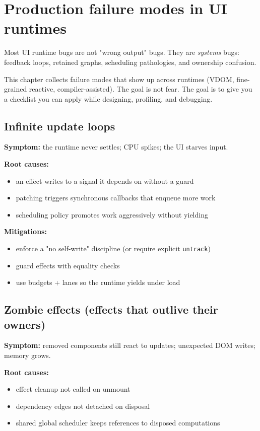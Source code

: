 \chapter{Production failure modes in UI runtimes}
\label{ch:failure-modes}

Most UI runtime bugs are not "wrong output" bugs.
They are \emph{systems} bugs: feedback loops, retained graphs, scheduling pathologies, and ownership confusion.

This chapter collects failure modes that show up across runtimes (VDOM, fine-grained reactive, compiler-assisted).
The goal is not fear.
The goal is to give you a checklist you can apply while designing, profiling, and debugging.

\section{Infinite update loops}

\textbf{Symptom:} the runtime never settles; CPU spikes; the UI starves input.

\textbf{Root causes:}
\begin{itemize}
  \item an effect writes to a signal it depends on without a guard
  \item patching triggers synchronous callbacks that enqueue more work
  \item scheduling policy promotes work aggressively without yielding
\end{itemize}

\textbf{Mitigations:}
\begin{itemize}
  \item enforce a "no self-write" discipline (or require explicit \texttt{untrack})
  \item guard effects with equality checks
  \item use budgets + lanes so the runtime yields under load
\end{itemize}

\section{Zombie effects (effects that outlive their owners)}

\textbf{Symptom:} removed components still react to updates; unexpected DOM writes; memory grows.

\textbf{Root causes:}
\begin{itemize}
  \item effect cleanup not called on unmount
  \item dependency edges not detached on disposal
  \item shared global scheduler keeps references to disposed computations
\end{itemize}

